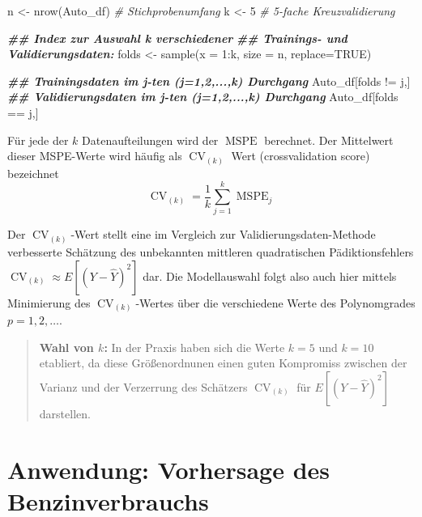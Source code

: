 \documentclass[
  ngerman,
]{book}
\newenvironment{Shaded}{\begin{snugshade}}{\end{snugshade}}
\newcommand{\AttributeTok}[1]{\textcolor[rgb]{0.77,0.63,0.00}{#1}}
\newcommand{\CommentTok}[1]{\textcolor[rgb]{0.56,0.35,0.01}{\textit{#1}}}
\newcommand{\ConstantTok}[1]{\textcolor[rgb]{0.00,0.00,0.00}{#1}}
\newcommand{\DecValTok}[1]{\textcolor[rgb]{0.00,0.00,0.81}{#1}}
\newcommand{\DocumentationTok}[1]{\textcolor[rgb]{0.56,0.35,0.01}{\textbf{\textit{#1}}}}
\newcommand{\FunctionTok}[1]{\textcolor[rgb]{0.00,0.00,0.00}{#1}}
\newcommand{\NormalTok}[1]{#1}
\newcommand{\OtherTok}[1]{\textcolor[rgb]{0.56,0.35,0.01}{#1}}
\newcommand{\SpecialCharTok}[1]{\textcolor[rgb]{0.00,0.00,0.00}{#1}}
\begin{document}
\begin{Shaded}
\begin{Highlighting}[]
\NormalTok{n      }\OtherTok{\textless{}{-}} \FunctionTok{nrow}\NormalTok{(Auto\_df) }\CommentTok{\# Stichprobenumfang}
\NormalTok{k      }\OtherTok{\textless{}{-}} \DecValTok{5}             \CommentTok{\# 5{-}fache Kreuzvalidierung}

\DocumentationTok{\#\# Index zur Auswahl k verschiedener  }
\DocumentationTok{\#\# Trainings{-} und Validierungsdaten:}
\NormalTok{folds  }\OtherTok{\textless{}{-}} \FunctionTok{sample}\NormalTok{(}\AttributeTok{x =} \DecValTok{1}\SpecialCharTok{:}\NormalTok{k, }\AttributeTok{size =}\NormalTok{ n, }\AttributeTok{replace=}\ConstantTok{TRUE}\NormalTok{)}

\DocumentationTok{\#\# Trainingsdaten im j{-}ten (j=1,2,...,k) Durchgang}
\NormalTok{Auto\_df[folds }\SpecialCharTok{!=}\NormalTok{ j,]}
\DocumentationTok{\#\# Validierungsdaten im j{-}ten (j=1,2,...,k) Durchgang}
\NormalTok{Auto\_df[folds }\SpecialCharTok{==}\NormalTok{ j,]}
\end{Highlighting}
\end{Shaded}

Für jede der \(k\) Datenaufteilungen wird der \(\operatorname{MSPE}\) berechnet. Der Mittelwert dieser MSPE-Werte wird häufig als \(\operatorname{CV}_{(k)}\) Wert (crossvalidation score) bezeichnet
\[
\operatorname{CV}_{(k)}=\frac{1}{k}\sum_{j=1}^k\operatorname{MSPE}_j
\]

Der \(\operatorname{CV}_{(k)}\)-Wert stellt eine im Vergleich zur Validierungsdaten-Methode verbesserte Schätzung des unbekannten mittleren quadratischen Pädiktionsfehlers \(\operatorname{CV}_{(k)}\approx E[(Y-\hat{Y})^2]\) dar. Die Modellauswahl folgt also auch hier mittels Minimierung des \(\operatorname{CV}_{(k)}\)-Wertes über die verschiedene Werte des Polynomgrades \(p=1,2,\dots\).

\begin{quote}
\textbf{Wahl von \(k\):} In der Praxis haben sich die Werte \(k=5\) und \(k=10\) etabliert, da diese Größenordnunen einen guten Kompromiss zwischen der Varianz und der Verzerrung des Schätzers \(\operatorname{CV}_{(k)}\) für \(E[(Y-\hat{Y})^2]\) darstellen.
\end{quote}

\hypertarget{anwendung-vorhersage-des-benzinverbrauchs}{%
\section{Anwendung: Vorhersage des Benzinverbrauchs}\label{anwendung-vorhersage-des-benzinverbrauchs}}
\end{document}
